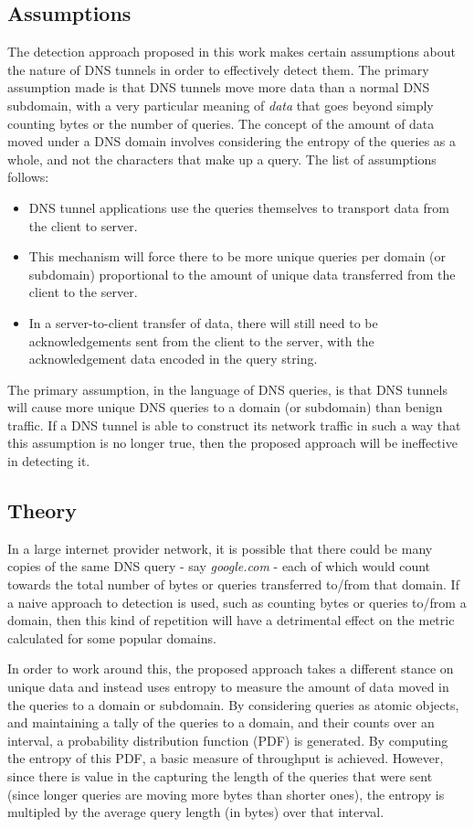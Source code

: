 \documentclass[12pt]{report}
\theoremstyle{remark}
\theoremstyle{definition}
\theoremstyle{definition}
\theoremstyle{definition}
\begin{document}
\subsection{Assumptions}
The detection approach proposed in this work
makes certain assumptions about the nature of DNS tunnels in order to
effectively detect them. The primary assumption made is that DNS tunnels move
more data than a normal DNS subdomain, with a very particular meaning of
\emph{data} that goes beyond simply counting bytes or the number of queries. The
concept of the amount of data moved under a DNS domain involves considering the
entropy of the queries as a whole, and not the characters that make up a query.
The list of assumptions follows:

\begin{itemize}
\item DNS tunnel applications use the queries themselves to transport data from
the client to server.
\item This mechanism will force there to be more unique
queries per domain (or subdomain) proportional to the amount of unique data transferred
from the client to the server.
\item In a server-to-client transfer of data, there will still need to be
acknowledgements sent from the client to the server, with the acknowledgement
data encoded in the query string.
\end{itemize}

The primary assumption, in the language of DNS queries, is that DNS tunnels will
cause more unique DNS queries to a domain (or subdomain) than benign traffic. If
a DNS tunnel is able to construct its network traffic in such a way that this
assumption is no longer true, then the proposed approach will be ineffective in
detecting it.

\subsection{Theory}
In a large internet provider network, it is possible that there could be many
copies of the same DNS query - say \emph{google.com} - each of which would count
towards the total number of bytes or queries transferred to/from that domain. If a naive
approach to detection is used, such as counting bytes or queries to/from a
domain, then this kind of repetition will have a detrimental effect on the
metric calculated for some popular domains.

In order to work around this, the proposed approach takes a different stance on
unique data and instead uses entropy to measure the amount of data moved in the
queries to a domain or subdomain. By considering queries as atomic objects, and
maintaining a tally of the queries to a domain, and their counts over an
interval, a probability distribution function (PDF) is generated. By computing
the entropy of this PDF, a basic measure of throughput is achieved. However,
since there is value in the capturing the length of the queries that were sent
(since longer queries are moving more bytes than shorter ones), the entropy is
multipled by the average query length (in bytes) over that interval.
\end{document}
